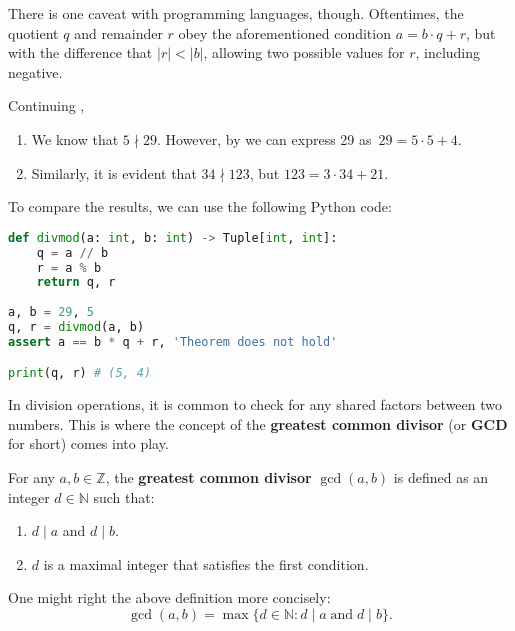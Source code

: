 \documentclass[../lecture-notes-148x210.tex]{subfiles}
\begin{document}
\begin{remark}
    There is one caveat with programming languages, though. Oftentimes, the
    quotient $q$ and remainder $r$ obey the aforementioned condition $a=b\cdot q+r$,
    but with the difference that $|r| < |b|$, allowing two possible values for $r$,
    including negative. 
\end{remark}

\begin{example} \label{example:divisibility_2}
    Continuing , \hfill
    \begin{enumerate}
        \item We know that $5 \nmid 29$. However, by  we can express 29 
        as~$29 = 5 \cdot 5 + 4$.
        \item Similarly, it is evident that $34 \nmid 123$, but $123 = 3 \cdot 34 + 21$.
    \end{enumerate}

    To compare the results, we can use the following Python code:
    \begin{lstlisting}[language=Python, numbers=none]
def divmod(a: int, b: int) -> Tuple[int, int]:
    q = a // b
    r = a % b
    return q, r
    
a, b = 29, 5
q, r = divmod(a, b)
assert a == b * q + r, 'Theorem does not hold'

print(q, r) # (5, 4)
\end{lstlisting}
\end{example}

In division operations, it is common to check for any shared factors between two
numbers. This is where the concept of the \textbf{greatest common divisor} (or
\textbf{GCD} for short) comes into play.

\begin{definition}[GCD]
    For any $a, b \in \mathbb{Z}$, the \textbf{greatest common divisor} \cite{Ben_Lynn_1980} $\gcd(a, b)$ is defined as an integer $d \in \mathbb{N}$ such that:
    \begin{enumerate}
        \item $d \mid a$ and $d \mid b$.
        \item $d$ is a maximal integer that satisfies the first condition.
    \end{enumerate}

    One might right the above definition more concisely:
    \begin{equation*}
        \gcd(a,b) = \max\{d \in \mathbb{N}: d \mid a \; \text{and} \; d \mid b\}.
    \end{equation*}
\end{definition}
\end{document}

